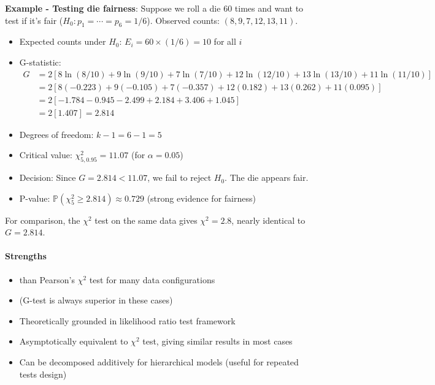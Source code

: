 
\textbf{Example - Testing die fairness}: Suppose we roll a die 60 times and want to test if it's fair
($H_0: p_1 = \cdots = p_6 = 1/6$). Observed counts: $(8, 9, 7, 12, 13, 11)$.
\begin{itemize}
    \item Expected counts under $H_0$: $E_i = 60 \times (1/6) = 10$ for all $i$
    \item G-statistic:
    \begin{align*}
    G &= 2[8\ln(8/10) + 9\ln(9/10) + 7\ln(7/10) + 12\ln(12/10) + 13\ln(13/10) + 11\ln(11/10)]\\
    &= 2[8(-0.223) + 9(-0.105) + 7(-0.357) + 12(0.182) + 13(0.262) + 11(0.095)]\\
    &= 2[-1.784 - 0.945 - 2.499 + 2.184 + 3.406 + 1.045]\\
    &= 2[1.407] = 2.814
    \end{align*}
    \item Degrees of freedom: $k - 1 = 6 - 1 = 5$
    \item Critical value: $\chi^2_{5, 0.95} = 11.07$ (for $\alpha = 0.05$)
    \item Decision: Since $G = 2.814 < 11.07$, we fail to reject $H_0$. The die appears fair.
    \item P-value: $\mathbb{P}(\chi^2_5 \geq 2.814) \approx 0.729$ (strong evidence for fairness)
\end{itemize}

For comparison, the $\chi^2$ test on the same data gives $\chi^2 = 2.8$, nearly identical to $G = 2.814$.

\paragraph{Strengths}
\begin{itemize}
    \item {} than Pearson's $\chi^{2}$ test
        for many data configurations
    \item {} (G-test is always superior in these cases)
    \item Theoretically grounded in likelihood ratio test framework
    \item Asymptotically equivalent to $\chi^2$ test, giving similar results in most cases
    \item Can be decomposed additively for hierarchical models (useful for repeated tests design)
\end{itemize}

